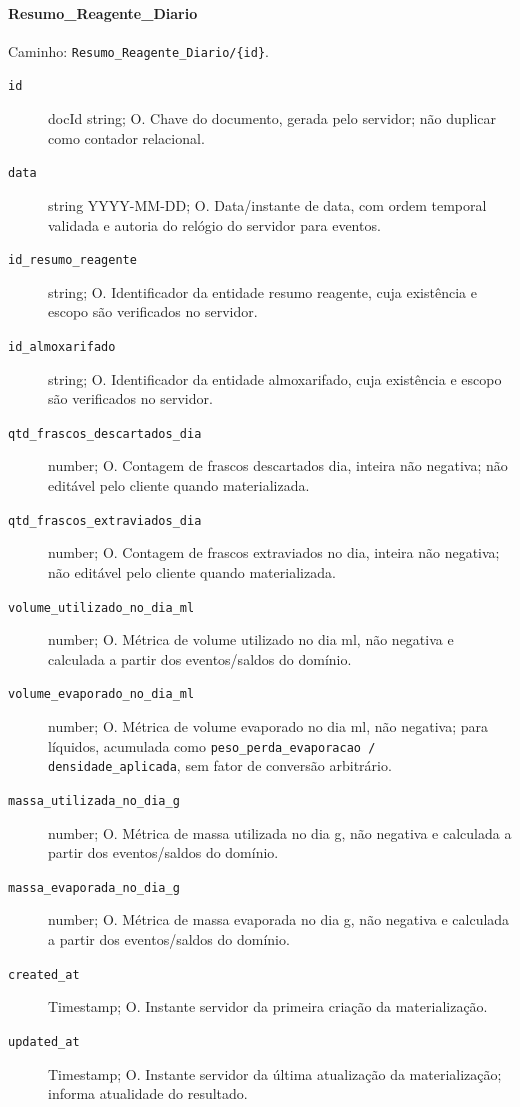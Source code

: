 \paragraph{Resumo\_Reagente\_Diario}\mbox{}\par
Caminho: \texttt{Resumo\_Reagente\_Diario/\{id\}}.
\begin{description}
\item[\texttt{id}] docId string; O. Chave do documento, gerada pelo servidor; não duplicar como contador relacional.
\item[\texttt{data}] string YYYY-MM-DD; O. Data/instante de data, com ordem temporal validada e autoria do relógio do servidor para eventos.
\item[\texttt{id\_resumo\_reagente}] string; O. Identificador da entidade resumo reagente, cuja existência e escopo são verificados no servidor.
\item[\texttt{id\_almoxarifado}] string; O. Identificador da entidade almoxarifado, cuja existência e escopo são verificados no servidor.
\item[\texttt{qtd\_frascos\_descartados\_dia}] number; O. Contagem de frascos descartados dia, inteira não negativa; não editável pelo cliente quando materializada.
\item[\texttt{qtd\_frascos\_extraviados\_dia}] number; O. Contagem de frascos extraviados no dia, inteira não negativa; não editável pelo cliente quando materializada.
\item[\texttt{volume\_utilizado\_no\_dia\_ml}] number; O. Métrica de volume utilizado no dia ml, não negativa e calculada a partir dos eventos/saldos do domínio.
\item[\texttt{volume\_evaporado\_no\_dia\_ml}] number; O. Métrica de volume evaporado no dia ml, não negativa; para líquidos, acumulada como \texttt{peso\_perda\_evaporacao / densidade\_aplicada}, sem fator de conversão arbitrário.
\item[\texttt{massa\_utilizada\_no\_dia\_g}] number; O. Métrica de massa utilizada no dia g, não negativa e calculada a partir dos eventos/saldos do domínio.
\item[\texttt{massa\_evaporada\_no\_dia\_g}] number; O. Métrica de massa evaporada no dia g, não negativa e calculada a partir dos eventos/saldos do domínio.
\item[\texttt{created\_at}] Timestamp; O. Instante servidor da primeira criação da materialização.
\item[\texttt{updated\_at}] Timestamp; O. Instante servidor da última atualização da materialização; informa atualidade do resultado.
\end{description}

